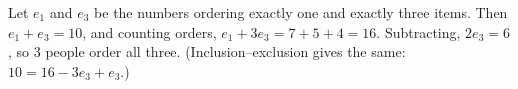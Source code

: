 Let $e_1$ and $e_3$ be the numbers ordering exactly one and exactly three items. Then $e_1+e_3=10$, and counting orders, $e_1+3e_3=7+5+4=16$. Subtracting, $2e_3=6$, so $\boxed{3}$ people order all three. (Inclusion--exclusion gives the same: $10=16-3e_3+e_3$.)
